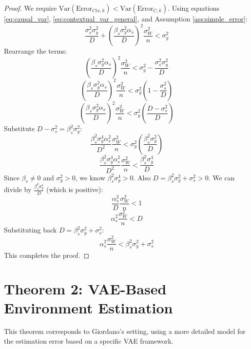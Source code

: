 \documentclass[11pt]{article}
\newcommand{\Var}{\mathrm{Var}}
\begin{document}
\begin{proof}
We require $\Var(\text{Error}_{Ctx,k}) < \Var(\text{Error}_{C,k})$. Using equations \eqref{eq:causal_var}, \eqref{eq:contextual_var_general}, and Assumption \ref{ass:simple_error}:
\[ \frac{\sigma_s^2 \sigma_y^2}{D} + \left(\frac{\beta_s \sigma_y^2 \alpha_s}{D}\right)^2 \frac{\sigma_W^2}{n} < \sigma_y^2 \]
Rearrange the terms:
\[ \left(\frac{\beta_s \sigma_y^2 \alpha_s}{D}\right)^2 \frac{\sigma_W^2}{n} < \sigma_y^2 - \frac{\sigma_s^2 \sigma_y^2}{D} \]
\[ \left(\frac{\beta_s \sigma_y^2 \alpha_s}{D}\right)^2 \frac{\sigma_W^2}{n} < \sigma_y^2 \left(1 - \frac{\sigma_s^2}{D}\right) \]
\[ \left(\frac{\beta_s \sigma_y^2 \alpha_s}{D}\right)^2 \frac{\sigma_W^2}{n} < \sigma_y^2 \left(\frac{D - \sigma_s^2}{D}\right) \]
Substitute $D - \sigma_s^2 = \beta_s^2 \sigma_y^2$:
\[ \frac{\beta_s^2 \sigma_y^4 \alpha_s^2}{D^2} \frac{\sigma_W^2}{n} < \sigma_y^2 \left(\frac{\beta_s^2 \sigma_y^2}{D}\right) \]
\[ \frac{\beta_s^2 \sigma_y^4 \alpha_s^2}{D^2} \frac{\sigma_W^2}{n} < \frac{\beta_s^2 \sigma_y^4}{D} \]
Since $\beta_s \neq 0$ and $\sigma_y^2 > 0$, we know $\beta_s^2 \sigma_y^4 > 0$. Also $D = \beta_s^2 \sigma_y^2 + \sigma_s^2 > 0$. We can divide by $\frac{\beta_s^2 \sigma_y^4}{D}$ (which is positive):
\[ \frac{\alpha_s^2}{D} \frac{\sigma_W^2}{n} < 1 \]
\[ \alpha_s^2 \frac{\sigma_W^2}{n} < D \]
Substituting back $D = \beta_s^2 \sigma_y^2 + \sigma_s^2$:
\[ \alpha_s^2 \frac{\sigma_W^2}{n} < \beta_s^2 \sigma_y^2 + \sigma_s^2 \]
This completes the proof.
\end{proof}

\section{Theorem 2: VAE-Based Environment Estimation}

This theorem corresponds to Giordano's setting, using a more detailed model for the estimation error based on a specific VAE framework.
\end{document}
